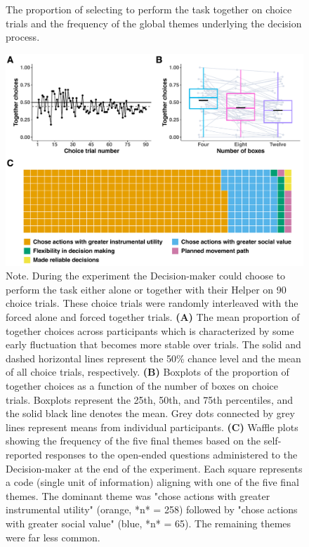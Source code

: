 \documentclass[
  man,
  floatsintext,
  longtable,
  nolmodern,
  notxfonts,
  notimes,
  mask,
  colorlinks=true,linkcolor=blue,citecolor=blue,urlcolor=blue]{apa7}
\begin{document}
\begin{figure}[htbp]
\caption{The proportion of selecting to perform the task together on choice trials and the frequency of the global themes underlying the decision process.}
\centering
\includegraphics[scale=0.675]{../../figs/fig2.pdf}
\setlength{\belowcaptionskip}{-2em}
\caption*{\singlespacing \small Note. \normalfont During the experiment the Decision-maker could choose to perform the task either alone or together with their Helper on 90 choice trials. These choice trials were randomly interleaved with the forced alone and forced together trials. \textbf{(A)} The mean proportion of together choices across participants which is characterized by some early fluctuation that becomes more stable over trials. The solid and dashed horizontal lines represent the 50\% chance level and the mean of all choice trials, respectively. \textbf{(B)} Boxplots of the proportion of together choices as a function of the number of boxes on choice trials. Boxplots represent the 25th, 50th, and 75th percentiles, and the solid black line denotes the mean. Grey dots connected by grey lines represent means from individual participants. \textbf{(C)} Waffle plots showing the frequency of the five final themes based on the self-reported responses to the open-ended questions administered to the Decision-maker at the end of the experiment. Each square represents a code (single unit of information) aligning with one of the five final themes. The dominant theme was "chose actions with greater instrumental utility" (orange, *n* = 258) followed by "chose actions with greater social value" (blue, *n* = 65). The remaining themes were far less common.
}
\label{fig:fig2}
\end{figure}
\end{document}
